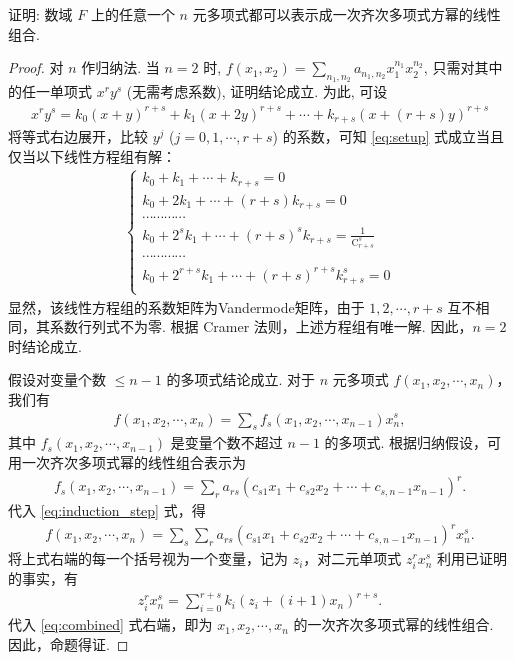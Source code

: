 \documentclass[../../main.tex]{subfiles}%
\begin{document}
\begin{example}
证明: 数域 \(F\) 上的任意一个 \(n\) 元多项式都可以表示成一次齐次多项式方幂的线性组合.
\end{example}
\begin{proof}
对 \(n\) 作归纳法. 当 \(n=2\) 时, \(f(x_1, x_2) = \sum\limits_{n_1, n_2} a_{n_1, n_2} x_1^{n_1} x_2^{n_2}\), 只需对其中的任一单项式 \(x^r y^s\) (无需考虑系数), 证明结论成立. 为此, 可设
\begin{align}
x^r y^s = k_0(x+y)^{r+s} + k_1(x+2y)^{r+s} + \cdots + k_{r+s}(x+(r+s)y)^{r+s} \label{eq:setup}
\end{align}
将等式右边展开，比较 \(y^j\) (\(j=0,1,\cdots,r+s\)) 的系数，可知 \eqref{eq:setup} 式成立当且仅当以下线性方程组有解：
\begin{align*}
\begin{cases}
k_0+k_1+\cdots +k_{r+s}=0\\
k_0+2k_1+\cdots +\left( r+s \right) k_{r+s}=0\\
\cdots \cdots \cdots \cdots\\
k_0+2^sk_1+\cdots +\left( r+s \right) ^sk_{r+s}=\frac{1}{\mathrm{C}_{r+s}^{s}}\\
\cdots \cdots \cdots \cdots\\
k_0+2^{r+s}k_1+\cdots +\left( r+s \right) ^{r+s}k_{r+s}^{s}=0\\
\end{cases}
\end{align*}
显然，该线性方程组的系数矩阵为Vandermode矩阵，由于 \(1, 2, \cdots, r+s\) 互不相同，其系数行列式不为零. 根据 Cramer 法则，上述方程组有唯一解. 因此，\(n=2\) 时结论成立.

假设对变量个数 \(\leqslant n-1\) 的多项式结论成立. 对于 \(n\) 元多项式 \(f(x_1,x_2,\cdots,x_n)\)，我们有
\begin{align}
f(x_1,x_2,\cdots,x_n) = \sum\limits_{s} f_s(x_1,x_2,\cdots,x_{n-1}) x_n^s, \label{eq:induction_step}
\end{align}
其中 \(f_s(x_1,x_2,\cdots,x_{n-1})\) 是变量个数不超过 \(n-1\) 的多项式. 根据归纳假设，可用一次齐次多项式幂的线性组合表示为
\begin{align*}
f_s(x_1,x_2,\cdots,x_{n-1}) = \sum\limits_{r} a_{rs} (c_{s1} x_1 + c_{s2} x_2 + \cdots + c_{s,n-1} x_{n-1})^r. 
\end{align*}
代入 \eqref{eq:induction_step} 式，得
\begin{align}
f(x_1,x_2,\cdots,x_n) = \sum\limits_{s} \sum\limits_{r} a_{rs} (c_{s1} x_1 + c_{s2} x_2 + \cdots + c_{s,n-1} x_{n-1})^r x_n^s. \label{eq:combined}
\end{align}
将上式右端的每一个括号视为一个变量，记为 \(z_i\)，对二元单项式 \(z_i^r x_n^s\) 利用已证明的事实，有
\begin{align*}
z_i^r x_n^s = \sum\limits_{i=0}^{r+s} k_i (z_i + (i+1) x_n)^{r+s}. 
\end{align*}
代入 \eqref{eq:combined} 式右端，即为 \(x_1, x_2, \cdots, x_n\) 的一次齐次多项式幂的线性组合. 因此，命题得证.
\end{proof}
\end{document}
